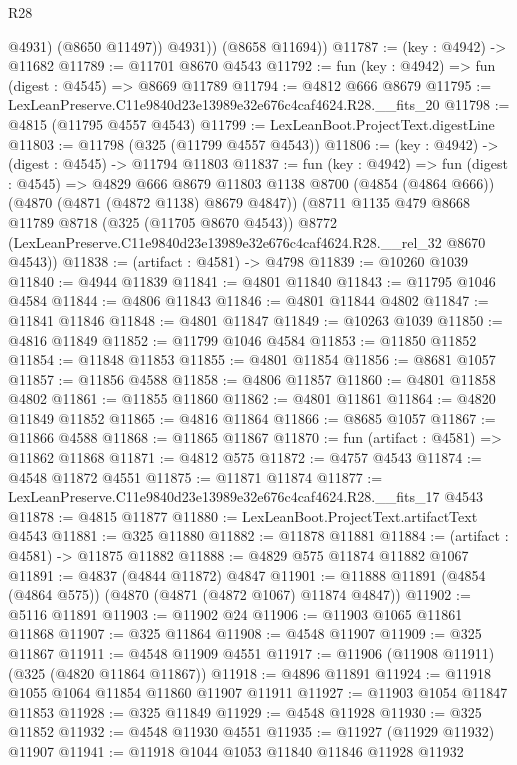 \begin{lexlean}{R28}
\begin{coremodule}
              @4931)
            (@8650 @11497))
          @4931))
      (@8658 @11694))
@11787 := (key : @4942) -> @11682
@11789 := @11701 @8670 @4543
@11792 := fun (key : @4942) => fun (digest : @4545) => @8669 @11789
@11794 := @4812 @666 @8679
@11795 := LexLeanPreserve.C11e9840d23e13989e32e676c4caf4624.R28.__fits_20
@11798 := @4815 (@11795 @4557 @4543)
@11799 := LexLeanBoot.ProjectText.digestLine
@11803 := @11798 (@325 (@11799 @4557 @4543))
@11806 := (key : @4942) -> (digest : @4545) -> @11794 @11803
@11837 := fun (key : @4942) =>
  fun (digest : @4545) =>
  @4829
    @666
    @8679
    @11803
    @1138
    @8700
    (@4854 (@4864 @666))
    (@4870 (@4871 (@4872 @1138) @8679 @4847))
    (@8711
      @1135
      @479
      @8668
      @11789
      @8718
      (@325 (@11705 @8670 @4543))
      @8772
      (LexLeanPreserve.C11e9840d23e13989e32e676c4caf4624.R28.__rel_32 @8670 @4543))
@11838 := (artifact : @4581) -> @4798
@11839 := @10260 @1039
@11840 := @4944 @11839
@11841 := @4801 @11840
@11843 := @11795 @1046 @4584
@11844 := @4806 @11843
@11846 := @4801 @11844 @4802
@11847 := @11841 @11846
@11848 := @4801 @11847
@11849 := @10263 @1039
@11850 := @4816 @11849
@11852 := @11799 @1046 @4584
@11853 := @11850 @11852
@11854 := @11848 @11853
@11855 := @4801 @11854
@11856 := @8681 @1057
@11857 := @11856 @4588
@11858 := @4806 @11857
@11860 := @4801 @11858 @4802
@11861 := @11855 @11860
@11862 := @4801 @11861
@11864 := @4820 @11849 @11852
@11865 := @4816 @11864
@11866 := @8685 @1057
@11867 := @11866 @4588
@11868 := @11865 @11867
@11870 := fun (artifact : @4581) => @11862 @11868
@11871 := @4812 @575
@11872 := @4757 @4543
@11874 := @4548 @11872 @4551
@11875 := @11871 @11874
@11877 := LexLeanPreserve.C11e9840d23e13989e32e676c4caf4624.R28.__fits_17 @4543
@11878 := @4815 @11877
@11880 := LexLeanBoot.ProjectText.artifactText @4543
@11881 := @325 @11880
@11882 := @11878 @11881
@11884 := (artifact : @4581) -> @11875 @11882
@11888 := @4829 @575 @11874 @11882 @1067
@11891 := @4837 (@4844 @11872) @4847
@11901 := @11888 @11891 (@4854 (@4864 @575)) (@4870 (@4871 (@4872 @1067) @11874 @4847))
@11902 := @5116 @11891
@11903 := @11902 @24
@11906 := @11903 @1065 @11861 @11868
@11907 := @325 @11864
@11908 := @4548 @11907
@11909 := @325 @11867
@11911 := @4548 @11909 @4551
@11917 := @11906 (@11908 @11911) (@325 (@4820 @11864 @11867))
@11918 := @4896 @11891
@11924 := @11918 @1055 @1064 @11854 @11860 @11907 @11911
@11927 := @11903 @1054 @11847 @11853
@11928 := @325 @11849
@11929 := @4548 @11928
@11930 := @325 @11852
@11932 := @4548 @11930 @4551
@11935 := @11927 (@11929 @11932) @11907
@11941 := @11918 @1044 @1053 @11840 @11846 @11928 @11932

\end{coremodule}
\end{lexlean}
